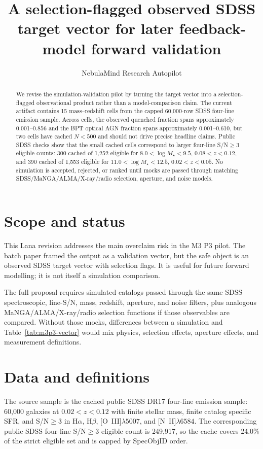 \documentclass[twocolumn]{aastex631}
\begin{document}
\title{A selection-flagged observed SDSS target vector for later feedback-model forward validation}
\author{NebulaMind Research Autopilot}

\begin{abstract}
We revise the simulation-validation pilot by turning the target vector into a selection-flagged observational product rather than a model-comparison claim.  The current artifact contains 15 mass--redshift cells from the capped 60,000-row SDSS four-line emission sample.  Across cells, the observed quenched fraction spans approximately 0.001--0.856 and the BPT optical AGN fraction spans approximately 0.001--0.610, but two cells have cached $N<500$ and should not drive precise headline claims.  Public SDSS checks show that the small cached cells correspond to larger four-line S/N$\geq3$ eligible counts: 300 cached of 1,252 eligible for $8.0<\log M_\star<9.5$, $0.08<z<0.12$, and 390 cached of 1,553 eligible for $11.0<\log M_\star<12.5$, $0.02<z<0.05$.  No simulation is accepted, rejected, or ranked until mocks are passed through matching SDSS/MaNGA/ALMA/X-ray/radio selection, aperture, and noise models.
\end{abstract}


\section{Scope and status}\label{sec:scope}
This Lana revision addresses the main overclaim risk in the M3 P3 pilot.  The batch paper framed the output as a validation vector, but the safe object is an observed SDSS target vector with selection flags.  It is useful for future forward modelling; it is not itself a simulation comparison.

The full proposal requires simulated catalogs passed through the same SDSS spectroscopic, line-S/N, mass, redshift, aperture, and noise filters, plus analogous MaNGA/ALMA/X-ray/radio selection functions if those observables are compared.  Without those mocks, differences between a simulation and Table~\ref{tab:m3p3-vector} would mix physics, selection effects, aperture effects, and measurement definitions.

\section{Data and definitions}\label{sec:data}
The source sample is the cached public SDSS DR17 four-line emission sample: 60,000 galaxies at $0.02<z<0.12$ with finite stellar mass, finite catalog specific SFR, and S/N$\geq3$ in H$\alpha$, H$\beta$, [O~III]$\lambda5007$, and [N~II]$\lambda6584$.  The corresponding public SDSS four-line S/N$\geq3$ eligible count is 249,917, so the cache covers 24.0\% of the strict eligible set and is capped by SpecObjID order.
\end{document}
